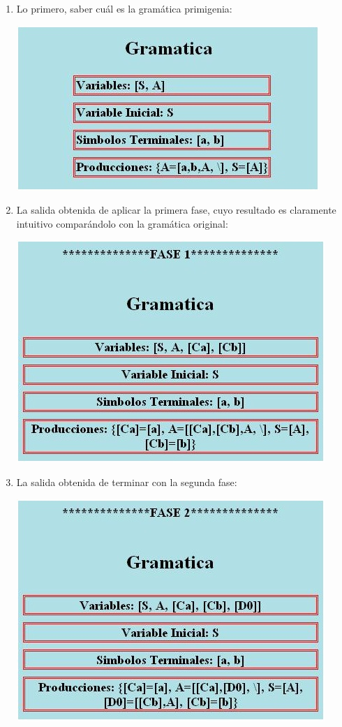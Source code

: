 \documentclass[12pt,a4paper,spanish]{book}
\begin{document}
\begin{enumerate}
\item Lo primero, saber cu\'al es la gram\'atica primigenia:\\
\begin{center}
\includegraphics{chom2.jpg}
\end{center}
\item La salida obtenida de aplicar la primera fase, cuyo resultado es claramente intuitivo compar\'andolo con la gram\'atica original:\\
\begin{center}
\includegraphics{chom3.jpg}
\end{center}
\newpage
\item La salida obtenida de terminar con la segunda fase:\\
\begin{center}
\includegraphics{chom4.jpg}

\end{center}
\end{enumerate}
\end{document}
